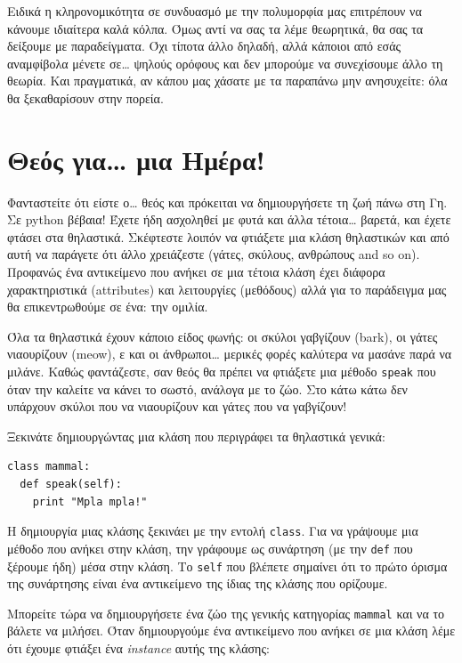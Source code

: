 Ειδικά η κληρονομικότητα σε συνδυασμό με την πολυμορφία μας επιτρέπουν να
κάνουμε ιδιαίτερα καλά κόλπα. Όμως αντί να σας τα λέμε θεωρητικά, θα σας
τα δείξουμε με παραδείγματα. Όχι τίποτα άλλο δηλαδή, αλλά κάποιοι από εσάς
αναμφίβολα μένετε σε\ldots{} ψηλούς ορόφους και δεν μπορούμε να συνεχίσουμε άλλο
τη θεωρία. Και πραγματικά, αν κάπου μας χάσατε με τα παραπάνω μην ανησυχείτε:
όλα θα ξεκαθαρίσουν στην πορεία.

\section{Θεός για\ldots{} μια Ημέρα!}

Φανταστείτε ότι είστε ο\ldots{} θεός και πρόκειται να δημιουργήσετε τη ζωή πάνω
στη Γη. Σε python βέβαια! Έχετε ήδη ασχοληθεί με φυτά και άλλα τέτοια\ldots{}
βαρετά, και έχετε φτάσει στα θηλαστικά. Σκέφτεστε λοιπόν να φτιάξετε μια
κλάση θηλαστικών και από αυτή να παράγετε ότι άλλο χρειάζεστε (γάτες,
σκύλους, ανθρώπους and so on). Προφανώς ένα αντικείμενο που ανήκει σε μια
τέτοια κλάση έχει διάφορα χαρακτηριστικά (attributes) και λειτουργίες
(μεθόδους) αλλά για το παράδειγμα μας θα επικεντρωθούμε σε ένα: την
ομιλία.

Όλα τα θηλαστικά έχουν κάποιο είδος φωνής: οι σκύλοι γαβγίζουν (bark), οι
γάτες νιαουρίζουν (meow), ε και οι άνθρωποι\ldots{} μερικές φορές καλύτερα να
μασάνε παρά να μιλάνε. Καθώς φαντάζεστε, σαν θεός θα πρέπει να φτιάξετε
μια μέθοδο {\tt speak} που όταν την καλείτε να κάνει το σωστό, ανάλογα με το
ζώο. Στο κάτω κάτω δεν υπάρχουν σκύλοι που να νιαουρίζουν και γάτες που
να γαβγίζουν!

Ξεκινάτε δημιουργώντας μια κλάση που περιγράφει τα θηλαστικά γενικά:

\begin{verbatim}
class mammal:
  def speak(self):
    print "Mpla mpla!"
\end{verbatim}

Η δημιουργία μιας κλάσης ξεκινάει με την εντολή {\tt class}. Για να γράψουμε μια
μέθοδο που ανήκει στην κλάση, την γράφουμε ως συνάρτηση (με την {\tt def} που
ξέρουμε ήδη) μέσα στην κλάση. Το {\tt self} που βλέπετε σημαίνει ότι το πρώτο
όρισμα της συνάρτησης είναι ένα αντικείμενο της ίδιας της κλάσης που ορίζουμε.

Μπορείτε τώρα να δημιουργήσετε ένα ζώο της γενικής κατηγορίας {\tt mammal} και να το βάλετε να μιλήσει. Όταν δημιουργούμε ένα αντικείμενο που ανήκει σε μια
κλάση λέμε ότι έχουμε φτιάξει ένα {\em instance} αυτής της κλάσης:

